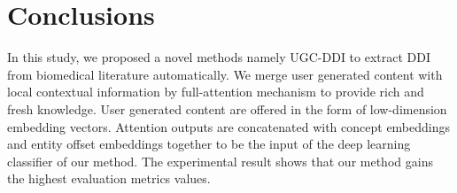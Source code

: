 \documentclass[conference]{IEEEtran}
\begin{document}
\section{Conclusions}
\label{sec:conclusions}

In this study, we proposed a novel methods namely UGC-DDI to extract DDI from biomedical literature automatically.
We merge user generated content with local contextual information by full-attention mechanism to provide rich and fresh knowledge.
User generated content are offered in the form of low-dimension embedding vectors.
Attention outputs are concatenated with concept embeddings and entity offset embeddings together to be the input of the deep learning classifier of our method.
The experimental result shows that our method gains the highest evaluation metrics values.



\end{document}
